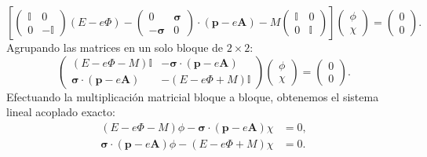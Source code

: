 \documentclass[10pt,a4paper]{article}
\begin{document}
\begin{equation}
\left[ \begin{pmatrix} \mathbb{I} & 0 \\ 0 & -\mathbb{I} \end{pmatrix} (E - e\Phi) - \begin{pmatrix} 0 & \boldsymbol{\sigma} \\ -\boldsymbol{\sigma} & 0 \end{pmatrix} \cdot (\mathbf{p} - e\mathbf{A}) - M \begin{pmatrix} \mathbb{I} & 0 \\ 0 & \mathbb{I} \end{pmatrix} \right] \begin{pmatrix} \phi \\ \chi \end{pmatrix} = \begin{pmatrix} 0 \\ 0 \end{pmatrix}.
\end{equation}
Agrupando las matrices en un solo bloque de $2 \times 2$:
\begin{equation}
\begin{pmatrix} (E - e\Phi - M)\mathbb{I} & -\boldsymbol{\sigma} \cdot (\mathbf{p} - e\mathbf{A}) \\ \boldsymbol{\sigma} \cdot (\mathbf{p} - e\mathbf{A}) & -(E - e\Phi + M)\mathbb{I} \end{pmatrix} \begin{pmatrix} \phi \\ \chi \end{pmatrix} = \begin{pmatrix} 0 \\ 0 \end{pmatrix}.
\end{equation}
Efectuando la multiplicación matricial bloque a bloque, obtenemos el sistema lineal acoplado exacto:
\begin{align}
(E - e\Phi - M)\phi - \boldsymbol{\sigma} \cdot (\mathbf{p} - e\mathbf{A}) \chi &= 0, \label{eq:spinor_phi} \\
\boldsymbol{\sigma} \cdot (\mathbf{p} - e\mathbf{A}) \phi - (E - e\Phi + M)\chi &= 0. \label{eq:spinor_chi}
\end{align}
\end{document}
